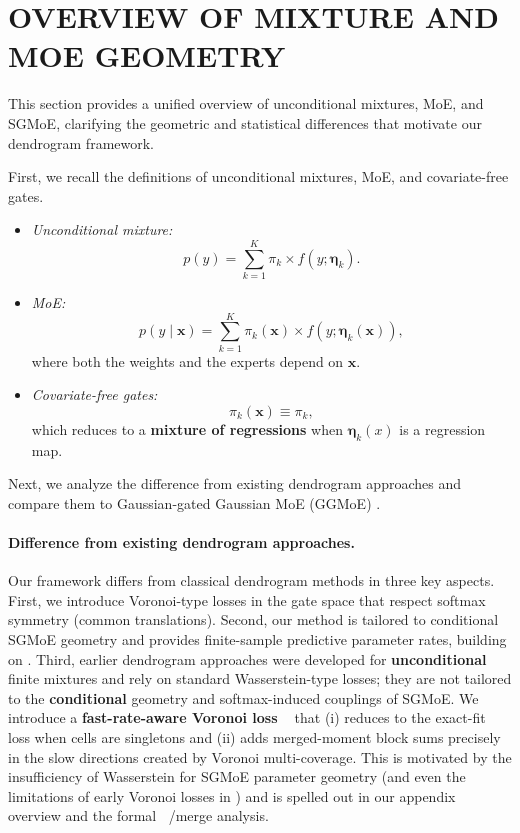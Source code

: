 \documentclass[twoside]{article}
\DeclareMathOperator*{\VDFRA}{D_{FRA}}
\theoremstyle{plain}
\theoremstyle{definition}
\theoremstyle{plain}
\def\veta{{\bm{\eta}}}
\def\vx{{\bm{x}}}
\begin{document}
\section{OVERVIEW OF MIXTURE AND MOE GEOMETRY}
\label{app:overview_moe}

This section provides a unified overview of unconditional mixtures, MoE, and SGMoE, clarifying the geometric and statistical differences that motivate our dendrogram framework.

First, we recall the definitions of unconditional mixtures, MoE, and covariate-free gates.

\begin{itemize}
        \item \textit{Unconditional mixture:}
        \begin{equation*}
            p(y) = \sum_{k=1}^{K} \pi_{k} \times f(y; \veta_{k}).
        \end{equation*}
        \item \textit{MoE:}
        \begin{equation*}
            p(y \mid \vx) = \sum_{k=1}^{K} \pi_{k}(\vx) \times f(y; \veta_{k}(\vx)),
        \end{equation*}
        where both the weights and the experts depend on $\vx$.
        \item \textit{Covariate-free gates:}
        \begin{equation*}
            \pi_{k}(\vx) \equiv \pi_{k},
        \end{equation*}
        which reduces to a \textbf{mixture of regressions} when $\veta_{k}(x)$ is a regression map.
    \end{itemize}

Next, we analyze the difference from existing dendrogram approaches and compare them to Gaussian-gated Gaussian MoE (GGMoE) \citep{thai_model_2025}.

\paragraph{Difference from existing dendrogram approaches.}
Our framework differs from classical dendrogram methods in three key aspects. 
First, we introduce Voronoi-type losses in the gate space that respect softmax symmetry (common translations). 
Second, our method is tailored to conditional SGMoE geometry and provides finite-sample predictive parameter rates, building on \cite{nguyen_demystifying_2023}. Third, earlier dendrogram approaches were developed for \textbf{unconditional} finite mixtures \citep{do_dendrogram_2024} and rely on standard Wasserstein-type losses; they are not tailored to the \textbf{conditional} geometry and softmax-induced couplings of SGMoE. We introduce a \textbf{fast-rate-aware Voronoi loss} $\VDFRA$ that (i) reduces to the exact-fit loss when cells are singletons and (ii) adds merged-moment block sums precisely in the slow directions created by Voronoi multi-coverage. 
This is motivated by the insufficiency of Wasserstein for SGMoE parameter geometry (and even the limitations of early Voronoi losses in \cite{nguyen_demystifying_2023}) and is spelled out in our appendix overview and the formal $\VDFRA$/merge analysis.
\end{document}
